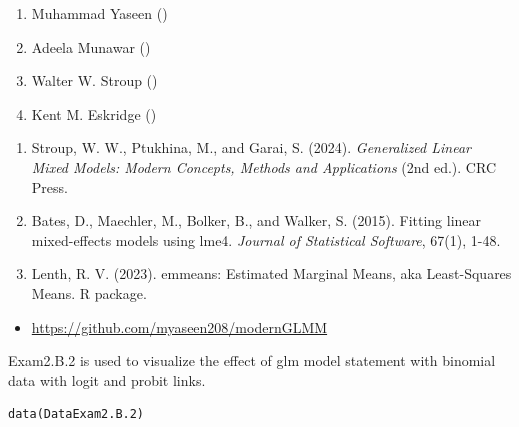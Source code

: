 \documentclass[a4paper]{book}
\begin{document}
%
\begin{Author}
\begin{enumerate}

\item{} Muhammad Yaseen ()
\item{} Adeela Munawar ()
\item{} Walter W. Stroup ()
\item{} Kent M. Eskridge ()

\end{enumerate}

\end{Author}
%
\begin{References}
\begin{enumerate}

\item{} Stroup, W. W., Ptukhina, M., and Garai, S. (2024).
\emph{Generalized Linear Mixed Models: Modern Concepts, Methods and
Applications} (2nd ed.). CRC Press.
\item{} Bates, D., Maechler, M., Bolker, B., and Walker, S. (2015).
Fitting linear mixed-effects models using lme4.
\emph{Journal of Statistical Software}, 67(1), 1-48.
\item{} Lenth, R. V. (2023). emmeans: Estimated Marginal Means,
aka Least-Squares Means. R package.

\end{enumerate}

\end{References}
%
\begin{SeeAlso}
\begin{itemize}

\item{} \url{https://github.com/myaseen208/modernGLMM}

\end{itemize}

\end{SeeAlso}
%
\begin{Description}
Exam2.B.2 is used to visualize the effect of glm model statement with binomial data with logit and probit links.
\end{Description}
%
\begin{Usage}
\begin{verbatim}
data(DataExam2.B.2)
\end{verbatim}
\end{Usage}
\end{document}
